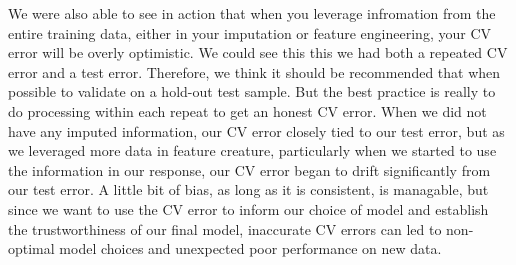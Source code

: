 \documentclass[12pt]{article}
\begin{document}
We were also able to see in action that when you leverage infromation from the entire training data, either in your imputation or feature engineering, your CV error will be overly optimistic.  We could see this this we had both a repeated CV error and a test error.  Therefore, we think it should be recommended that when possible to validate on a hold-out test sample.  But the best practice is really to do processing within each repeat to get an honest CV error.  When we did not have any imputed information, our CV error closely tied to our test error, but as we leveraged more data in feature creature, particularly when we started to use the information in our response, our CV error began to drift significantly from our test error.  A little bit of bias, as long as it is consistent, is managable, but since we want to use the CV error to inform our choice of model and establish the trustworthiness of our final model, inaccurate CV errors can led to non-optimal model choices and unexpected poor performance on new data.
\end{document}
